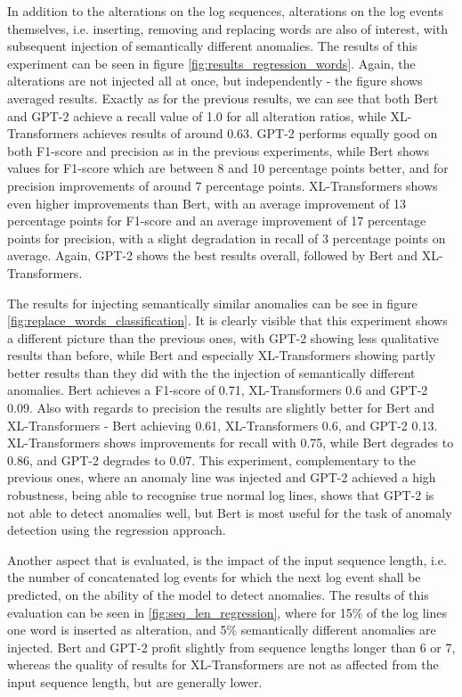 In addition to the alterations on the log sequences, alterations on the log events themselves, i.e. inserting, removing and replacing words are also of interest, with subsequent injection of semantically different anomalies. The results of this experiment can be seen in figure \ref{fig:results_regression_words}. Again, the alterations are not injected all at once, but independently - the figure shows averaged results. Exactly as for the previous results, we can see that both Bert and GPT-2 achieve a recall value of 1.0 for all alteration ratios, while XL-Transformers achieves results of around 0.63. GPT-2 performs equally good on both F1-score and precision as in the previous experiments, while Bert shows values for F1-score which are between 8 and 10 percentage points better, and for precision improvements of around 7 percentage points. XL-Transformers shows even higher improvements than Bert, with an average improvement of 13 percentage points for F1-score and an average improvement of 17 percentage points for precision, with a slight degradation in recall of 3 percentage points on average. Again, GPT-2 shows the best results overall, followed by Bert and XL-Transformers.

The results for injecting semantically similar anomalies can be see in figure \ref{fig:replace_words_classification}. It is clearly visible that this experiment shows a different picture than the previous ones, with GPT-2 showing less qualitative results than before, while Bert and especially XL-Transformers showing partly better results than they did with the the injection of semantically different anomalies. Bert achieves a F1-score of 0.71, XL-Transformers 0.6 and GPT-2 0.09. Also with regards to precision the results are slightly better for Bert and XL-Transformers - Bert achieving 0.61, XL-Transformers 0.6, and GPT-2 0.13. XL-Transformers shows improvements for recall with 0.75, while Bert degrades to 0.86, and GPT-2 degrades to 0.07. This experiment, complementary to the previous ones, where an anomaly line was injected and GPT-2 achieved a high robustness, being able to recognise true normal log lines, shows that GPT-2 is not able to detect anomalies well, but Bert is most useful for the task of anomaly detection using the regression approach.

Another aspect that is evaluated, is the impact of the input sequence length, i.e. the number of concatenated log events for which the next log event shall be predicted, on the ability of the model to detect anomalies. The results of this evaluation can be seen in \ref{fig:seq_len_regression}, where for 15\% of the log lines one word is inserted as alteration, and 5\% semantically different anomalies are injected. Bert and GPT-2 profit slightly from sequence lengths longer than 6 or 7, whereas the quality of results for XL-Transformers are not as affected from the input sequence length, but are generally lower.

